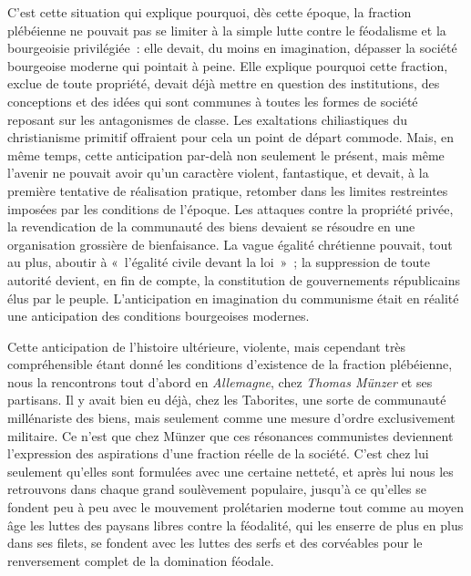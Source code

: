 \documentclass[french,twoside]{book} %
\begin{document}
C’est cette situation qui explique pourquoi, dès cette époque, la fraction plébéienne ne pouvait pas se limiter à la simple lutte contre le féodalisme et la bourgeoisie privilégiée : elle devait, du moins en imagination, dépasser la société bourgeoise moderne qui pointait à peine. Elle explique pourquoi cette fraction, exclue de toute propriété, devait déjà mettre en question des institutions, des conceptions et des idées qui sont communes à toutes les formes de société reposant sur les antagonismes de classe. Les exaltations chiliastiques du christianisme primitif offraient pour cela un point de départ commode. Mais, en même temps, cette anticipation par-delà non seulement le présent, mais même l’avenir ne pouvait avoir qu’un caractère violent, fantastique, et devait, à la première tentative de réalisation pratique, retomber dans les limites restreintes imposées par les conditions de l’époque. Les attaques contre la propriété privée, la revendication de la communauté des biens devaient se résoudre en une organisation grossière de bienfaisance. La vague égalité chrétienne pouvait, tout au plus, aboutir à « l’égalité civile devant la loi » ; la suppression de toute autorité devient, en fin de compte, la constitution de gouvernements républicains élus par le peuple. L’anticipation en imagination du communisme était en réalité une anticipation des conditions bourgeoises modernes.\par
Cette anticipation de l’histoire ultérieure, violente, mais cependant très compréhensible étant donné les conditions d’existence de la fraction plébéienne, nous la rencontrons tout d’abord en \emph{Allemagne}, chez \emph{Thomas Münzer} et ses partisans. Il y avait bien eu déjà, chez les Taborites, une sorte de communauté millénariste des biens, mais seulement comme une mesure d’ordre exclusivement militaire. Ce n’est que chez Münzer que ces résonances communistes deviennent l’expression des aspirations d’une fraction réelle de la société. C’est chez lui seulement qu’elles sont formulées avec une certaine netteté, et après lui nous les retrouvons dans chaque grand soulèvement populaire, jusqu’à ce qu’elles se fondent peu à peu avec le mouvement prolétarien moderne tout comme au moyen âge les luttes des paysans libres contre la féodalité, qui les enserre de plus en plus dans ses filets, se fondent avec les luttes des serfs et des corvéables pour le renversement complet de la domination féodale.\par
\end{document}
